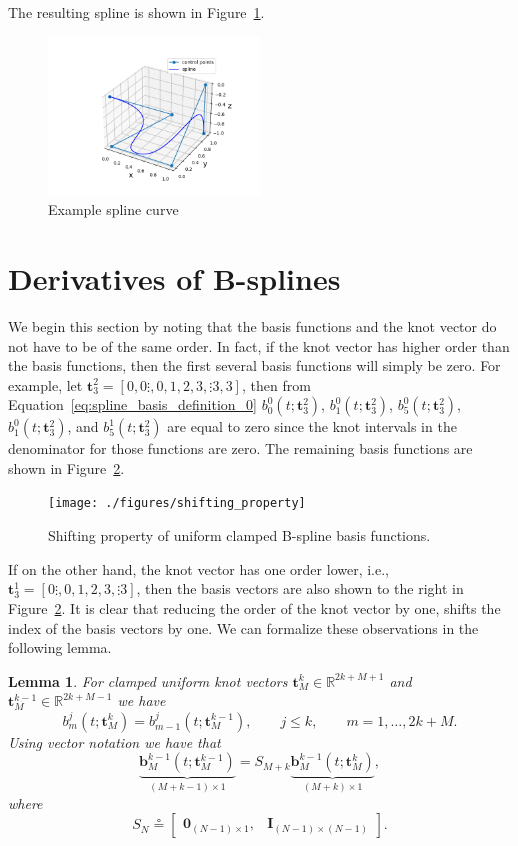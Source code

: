 \documentclass{article}
\newtheorem{lemma}[theorem]{Lemma}
\newcommand{\defeq}{\circeq}
\newcommand{\bbf}{\mathbf{b}}
\begin{document}
The resulting spline is shown in Figure~\ref{fig:example_spline_curve}.
\begin{figure}[hbt]
  \centering\includegraphics[width=0.5\textwidth]{./figures/example_spline_curve}
  \caption{Example spline curve}
  \label{fig:example_spline_curve}  
\end{figure}

\section{Derivatives of B-splines}

We begin this section by noting that the basis functions and the knot vector do not have to be of the same order.  In fact, if the knot vector has higher order than the basis functions, then the first several basis functions will simply be zero.  
For example, let $\mathbf{t}_3^2 = [0, 0\vdots, 0, 1, 2, 3, \vdots 3, 3]$, then from Equation~\eqref{eq:spline_basis_definition_0} $b_0^0(t; \mathbf{t}_3^2)$, $b_1^0(t; \mathbf{t}_3^2)$, $b_5^0(t; \mathbf{t}_3^2)$, $b_1^0(t; \mathbf{t}_3^2)$, and $b_5^1(t; \mathbf{t}_3^2)$ are equal to zero since the knot intervals in the denominator for those functions are zero.  The remaining basis functions are shown in Figure~\ref{fig:shifting_property}.
\begin{figure}[hbt]
  \centering\texttt{[image: ./figures/shifting\_property]}
  \caption{Shifting property of uniform clamped B-spline basis functions.}
  \label{fig:shifting_property}  
\end{figure}
If on the other hand, the knot vector has one order lower, i.e., $\mathbf{t}_3^1 = [0\vdots, 0, 1, 2, 3, \vdots 3]$, then the basis vectors are also shown to the right in Figure~\ref{fig:shifting_property}.  It is clear that reducing the order of the knot vector by one, shifts the index of the basis vectors by one.  We can formalize these observations in the following lemma.
\begin{lemma} \label{lem:shifting_property}
For clamped uniform knot vectors $\mathbf{t}_M^k \in \mathbb{R}^{2k+M+1}$ and $\mathbf{t}_M^{k-1}\in\mathbb{R}^{2k+M-1}$ we have
\[
b_m^j(t; \mathbf{t}_M^k) = b_{m-1}^j(t; \mathbf{t}_M^{k-1}), \qquad j \leq k, \qquad m = 1, \dots, 2k+M.
\]	
Using vector notation we have that
\[
\underbrace{\bbf_M^{k-1}(t; \mathbf{t}_M^{k-1})}_{(M+k-1)\times 1} = S_{M+k} \underbrace{\bbf_M^{k-1}(t; \mathbf{t}_M^k)}_{(M+k)\times 1},
\]
where
\[
	S_{N} \defeq \begin{bmatrix} \mathbf{0}_{(N-1)\times 1}, & \mathbf{I}_{(N-1) \times (N-1)} \end{bmatrix}.
\]
\end{lemma}
\end{document}
